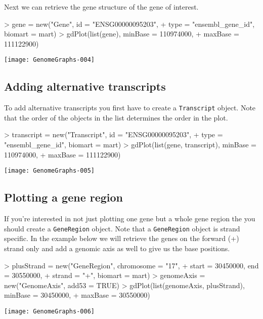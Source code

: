\documentclass[11pt]{article}
\newcommand{\Robject}[1]{{\texttt{#1}}}
\begin{document}
Next we can retrieve the gene structure of the gene of interest.

\begin{Schunk}
\begin{Sinput}
> gene = new("Gene", id = "ENSG00000095203", 
+     type = "ensembl_gene_id", biomart = mart)
> gdPlot(list(gene), minBase = 110974000, 
+     maxBase = 111122900)
\end{Sinput}
\end{Schunk}
\texttt{[image: GenomeGraphs-004]}

\subsection{Adding alternative transcripts}

To add alternative transcripts you first have to create a \Robject{Transcript} object.
Note that the order of the objects in the list determines the order in the plot.
\begin{Schunk}
\begin{Sinput}
> transcript = new("Transcript", id = "ENSG00000095203", 
+     type = "ensembl_gene_id", biomart = mart)
> gdPlot(list(gene, transcript), minBase = 110974000, 
+     maxBase = 111122900)
\end{Sinput}
\end{Schunk}
\texttt{[image: GenomeGraphs-005]}

\subsection{Plotting a gene region}

If you're interested in not just plotting one gene but a whole gene
region the you should create a \Robject{GeneRegion} object.  Note that
a \Robject{GeneRegion} object is strand specific.  In the example
below we will retrieve the genes on the forward (+) strand only and
add a genomic axis as well to give us the base positions.

\begin{Schunk}
\begin{Sinput}
> plusStrand = new("GeneRegion", chromosome = "17", 
+     start = 30450000, end = 30550000, 
+     strand = "+", biomart = mart)
> genomeAxis = new("GenomeAxis", add53 = TRUE)
> gdPlot(list(genomeAxis, plusStrand), minBase = 30450000, 
+     maxBase = 30550000)
\end{Sinput}
\end{Schunk}
\texttt{[image: GenomeGraphs-006]}
\end{document}
